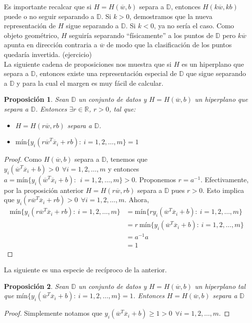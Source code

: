 \documentclass[11pt]{article}
\newtheorem{proposition}{Proposición}[section]
\newcommand{\R}{\mathbb{R}}
\newcommand{\wv}{\overline{w}}
\newcommand{\x}{\overline{x}}
\newcommand{\Sm}{1,2,\ldots, m}
\newcommand{\Dat}{\mathbb{D}}
\begin{document}
Es importante recalcar que si $H=H(\wv, b)$ separa a $\Dat$, entonces $H(k\wv, kb)$ puede o no seguir separando a $\Dat$. Si $k>0$, demostramos que la nueva representación de $H$ sigue separando a $\Dat$. Si $k<0$, ya no sería el caso. Como objeto geométrico, $H$ seguiría separando ``físicamente'' a los puntos de $\Dat$ pero $k\wv$ apunta en dirección contraria a $\wv$ de modo que la clasificación de los puntos quedaría invertida. (ejercicio)\\

La siguiente cadena de proposiciones nos muestra que si $H$ es un hiperplano que separa a $\Dat$, entonces existe una representación especial de $\Dat$ que sigue separando a $\Dat$ y para la cual el margen es muy fácil de calcular.

\begin{proposition}
Sean $\Dat$ un conjunto de datos y $H=H(\wv,b)$ un hiperplano que separa a $\Dat$. Entonces $\exists r\in\R$, $r>0$, tal que:
\begin{itemize}
\item[(i)] $H=H(r\wv, rb)$ separa a $\Dat$.
\item[(ii)] $\text{mín}\{y_{i}(r\wv^{T}\x_{i}+rb):\ i=\Sm \}=1$
\end{itemize}
\end{proposition}
\begin{proof}
Como $H(\wv, b)$ separa a $\Dat$, tenemos que $y_{i}(\wv ^{T}\x_{i}+b)>0\ \ \forall i=\Sm$ y entonces $a=\text{mín}\{y_{i}(\wv^{T}\x_{i}+b):\ \ i=\Sm \}>0$. Proponemos $r=a^{-1}$. Efectivamente, por la proposición anterior $H=H(r\wv, rb)$ separa a $\Dat$ pues $r>0$. Esto implica que $y_{i}(r\wv^{T}\x_{i}+rb)>0\ \ \forall i=\Sm $. Ahora,
\begin{equation*}
\begin{aligned}
\text{mín}\{y_{i}(r\wv^{T}\x_{i}+rb):\ i=\Sm \}&=\text{mín}\{ry_{i}(\wv^{T}\x_{i}+b):\ i=\Sm \}\\
&=r\ \text{mín}\{y_{i}(\wv^{T}\x_{i}+b):\ i=\Sm \}\\
&=a^{-1}a\\
&=1
\end{aligned}
\end{equation*}
\end{proof}

La siguiente es una especie de recíproco de la anterior.

\begin{proposition}
Sean $\Dat$ un conjunto de datos y $H=H(\wv, b)$ un hiperplano tal que $\text{mín}\{y_{i}(\wv^{T}\x_{i}+b):\ i=\Sm \}=1$. Entonces $H=H(\wv, b)$ separa a $\Dat$
\end{proposition}
\begin{proof}
Simplemente notamos que $y_{i}(\wv^{T}\x_{i}+b)\geq1>0\ \ \forall i=\Sm$.
\end{proof}
\end{document}

